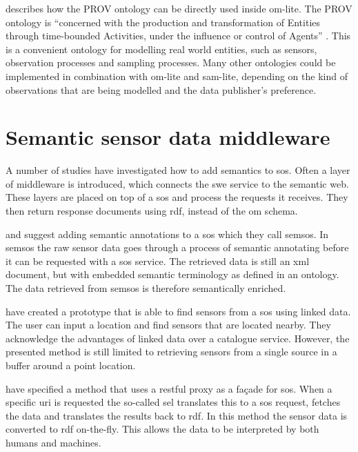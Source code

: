 \cite{SSW:Cox4} describes how the PROV ontology \citep{LD:PROV} can be directly used inside om-lite. The PROV ontology is \enquote{concerned with the production and transformation of Entities through time-bounded Activities, under the influence or control of Agents} \cite[p. 12]{SSW:Cox4}. This is a convenient ontology for modelling real world entities, such as sensors, observation processes and sampling processes. Many other ontologies could be implemented in combination with om-lite and sam-lite, depending on the kind of observations that are being modelled and the data publisher's preference. 


\section{Semantic sensor data middleware}
\label{par:middleware}
A number of studies have investigated how to add semantics to \ac{sos}. Often a layer of middleware is introduced, which connects the \ac{swe} service to the semantic web. These layers are placed on top of a \ac{sos} and process the requests it receives. They then return response documents using \ac{rdf}, instead of the \ac{om} schema.  

\cite{SSW:Henson} and \cite{SSW:Pschorr} suggest adding semantic annotations to a \ac{sos} which they call \ac{semsos}. In \ac{semsos} the raw sensor data goes through a process of semantic annotating before it can be requested with a \ac{sos} service. The retrieved data is still an \ac{xml} document, but with embedded semantic terminology as defined in an ontology. The data retrieved from \ac{semsos} is therefore semantically enriched.  

\cite{SSW:Pschorr2} have created a prototype that is able to find sensors from a \ac{sos} using linked data. The user can input a location and find sensors that are located nearby. They acknowledge the advantages of linked data over a catalogue service. However, the presented method is still limited to retrieving sensors from a single source in a buffer around a point location.  

\cite{SSW:Janowicz} have specified a method that uses a \ac{rest}ful proxy as a fa\c{c}ade for \ac{sos}. When a specific \ac{uri} is requested the so-called \ac{sel} translates this to a \ac{sos} request, fetches the data and translates the results back to \ac{rdf}. In this method the sensor data is converted to \ac{rdf} on-the-fly. This allows the data to be interpreted by both humans and machines.  

